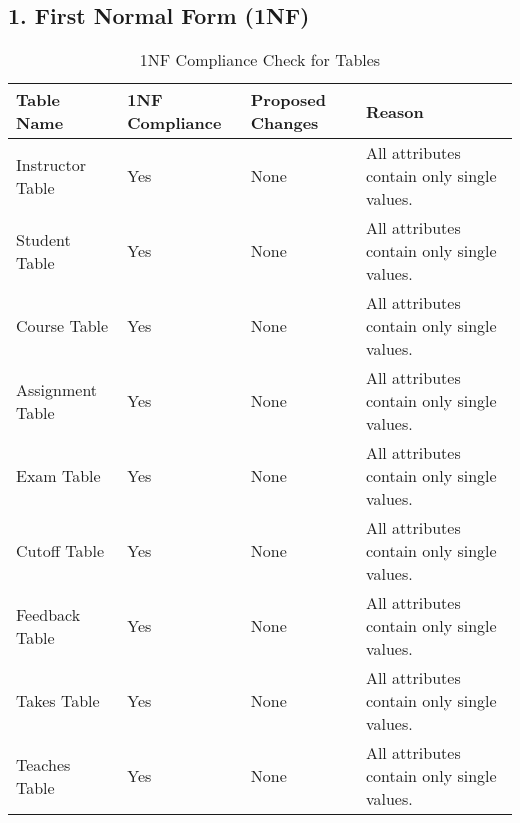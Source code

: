 \documentclass[12pt]{article}
\begin{document}
\subsection*{1. First Normal Form (1NF)}
\begin{table}[ht]
    \centering
    \begin{tabularx}{\textwidth}{|X|X|X|X|}
        \hline
        \textbf{Table Name} & \textbf{1NF Compliance} & \textbf{Proposed Changes} & \textbf{Reason} \\
        \hline
        Instructor Table & Yes & None & All attributes contain only single values. \\
        \hline
        Student Table & Yes & None & All attributes contain only single values. \\
        \hline
        Course Table & Yes & None & All attributes contain only single values. \\
        \hline
        Assignment Table & Yes & None & All attributes contain only single values. \\
        \hline
        Exam Table & Yes & None & All attributes contain only single values. \\
        \hline
        Cutoff Table & Yes & None & All attributes contain only single values. \\
        \hline
        Feedback Table & Yes & None & All attributes contain only single values. \\
        \hline
        Takes Table & Yes & None & All attributes contain only single values. \\
        \hline
        Teaches Table & Yes & None & All attributes contain only single values. \\
        \hline
    \end{tabularx}
    \caption{1NF Compliance Check for Tables}
    \label{tab:1nf_compliance}
\end{table}

\pagebreak
\end{document}
